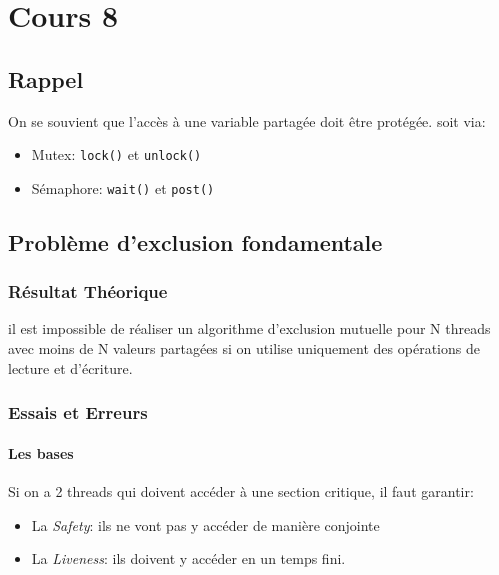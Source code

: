 \section{Cours 8}\label{cours-8}

\subsection{Rappel}\label{rappel}

On se souvient que l'accès à une variable partagée doit être protégée.
soit via:

\begin{itemize}
\tightlist
\item
  Mutex: \texttt{lock()} et \texttt{unlock()}
\item
  Sémaphore: \texttt{wait()} et \texttt{post()}
\end{itemize}

\subsection{Problème d'exclusion
fondamentale}\label{probluxe8me-dexclusion-fondamentale}

\subsubsection{Résultat Théorique}\label{ruxe9sultat-thuxe9orique}

il est impossible de réaliser un algorithme d'exclusion mutuelle pour N
threads avec moins de N valeurs partagées si on utilise uniquement des
opérations de lecture et d'écriture.

\subsubsection{Essais et Erreurs}\label{essais-et-erreurs}

\paragraph{Les bases}\label{les-bases}

Si on a 2 threads qui doivent accéder à une section critique, il faut
garantir:

\begin{itemize}
\tightlist
\item
  La \emph{Safety}: ils ne vont pas y accéder de manière conjointe
\item
  La \emph{Liveness}: ils doivent y accéder en un temps fini.
\end{itemize}

